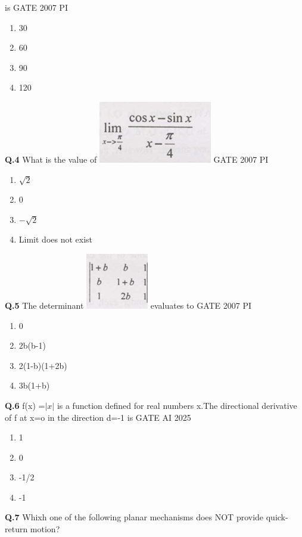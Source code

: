 \documentclass[journal,12pt,onecolumn]{exam}
\theoremstyle{remark}
\begin{document}
      is
      \hfill{GATE 2007 PI}
      \begin{enumerate}
          \item 30
          \item 60
          \item 90
          \item 120
      \end{enumerate}
      \noindent
      \textbf{Q.4}
        What is the value of
\includegraphics[width=0.2\linewidth]{figs/Q.4.png}
\hfill{GATE 2007 PI}
\begin{enumerate}
    \item $\sqrt{2}$\\
    \item 0\\
    \item $-\sqrt{2}$\\
    \item Limit does not exist
    \end{enumerate} 
    \noindent
    \textbf{Q.5}
    The determinant
\includegraphics[width=0.2\linewidth]{figs/Q.5.png}
evaluates to
\hfill{GATE 2007 PI}
\begin{enumerate}
    \item 0
    \item 2b(b-1)
    \item 2(1-b)(1+2b)
    \item 3b(1+b)
\end{enumerate}
\noindent
\textbf{Q.6}
f(x) =$|x|$ is a function defined for real numbers x.The directional derivative of f at x=o in the direction d=-1 is
\hfill{GATE AI 2025}
\begin{enumerate}
    \item 1
    \item 0
    \item -1/2
    \item -1
\end{enumerate}
\noindent
\textbf{Q.7}
Whixh one of the following planar mechanisms does NOT provide quick-return motion?
\end{document}
